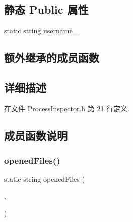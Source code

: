 \subsection*{静态 Public 属性}
\begin{DoxyCompactItemize}
\item 
static string \hyperlink{classmuduo_1_1net_1_1ProcessInspector_a1ee37eaede4098b7d83340cc202963d5}{username\+\_\+}
\end{DoxyCompactItemize}
\subsection*{额外继承的成员函数}


\subsection{详细描述}


在文件 Process\+Inspector.\+h 第 21 行定义.



\subsection{成员函数说明}
\mbox{\label{classmuduo_1_1net_1_1ProcessInspector_a592bc6f5c15abc09e7bc7bded42fa9d2}} 
\subsubsection{\texorpdfstring{opened\+Files()}{openedFiles()}}
{\footnotesize\ttfamily static string opened\+Files (\begin{DoxyParamCaption}\item[{\hyperlink{classmuduo_1_1net_1_1HttpRequest_a2a3c0067e44c5ef3210a256d06c16b0f}{Http\+Request\+::\+Method}}]{,  }\item[{const \hyperlink{classmuduo_1_1net_1_1Inspector_aa22799cd3b4f56688d431d68c2d014a0}{Inspector\+::\+Arg\+List} \&}]{ }\end{DoxyParamCaption})\hspace{0.3cm}{\ttfamily [static]}}

\mbox{\label{classmuduo_1_1net_1_1ProcessInspector_a6c5dee6f9bf1f45afb67379698a87ecb}} 
